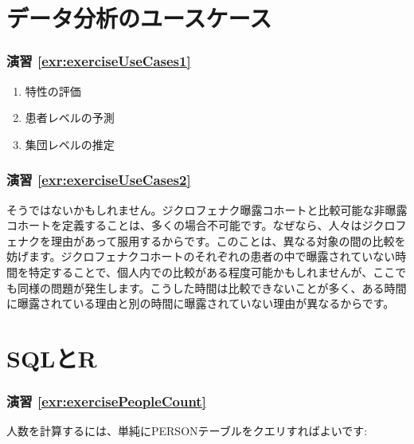 \documentclass[
  11pt]{book}
\theoremstyle{definition}
\theoremstyle{definition}
\theoremstyle{definition}
\theoremstyle{definition}
\theoremstyle{remark}
\begin{document}
\section{データ分析のユースケース}\label{UseCasesanswers}

\subsubsection*{演習 \ref{exr:exerciseUseCases1}}\label{ux6f14ux7fd2-refexrexerciseusecases1}

\begin{enumerate}
\def\labelenumi{\arabic{enumi}.}
\item
  特性の評価
\item
  患者レベルの予測
\item
  集団レベルの推定
\end{enumerate}

\subsubsection*{演習 \ref{exr:exerciseUseCases2}}\label{ux6f14ux7fd2-refexrexerciseusecases2}

そうではないかもしれません。ジクロフェナク曝露コホートと比較可能な非曝露コホートを定義することは、多くの場合不可能です。なぜなら、人々はジクロフェナクを理由があって服用するからです。このことは、異なる対象の間の比較を妨げます。ジクロフェナクコホートのそれぞれの患者の中で曝露されていない時間を特定することで、個人内での比較がある程度可能かもしれませんが、ここでも同様の問題が発生します。こうした時間は比較できないことが多く、ある時間に曝露されている理由と別の時間に曝露されていない理由が異なるからです。

\section{SQLとR}\label{SqlAndRanswers}

\subsubsection*{演習 \ref{exr:exercisePeopleCount}}\label{ux6f14ux7fd2-refexrexercisepeoplecount}

人数を計算するには、単純にPERSONテーブルをクエリすればよいです:
\end{document}
